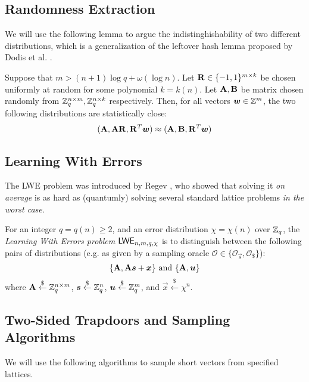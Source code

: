 \subsection{Randomness Extraction}

We will use the following lemma to argue the indistinghishability of two different distributions, which is a generalization of the leftover hash lemma proposed by Dodis et al. \cite{EC:DodReySmi04}.

\begin{lemma} \label{lem:lhl}
Suppose that $m > (n + 1) \log q + \omega(\log n)$. Let $\mathbf{R} \in \{-1, 1\}^{m \times k}$ be chosen uniformly at random for some polynomial $k = k(n)$. Let $\mathbf{A}, \mathbf{B}$ be matrix chosen randomly from $\mathbb{Z}^{n \times m}_q, \mathbb{Z}^{n \times k}_q$ respectively. Then, for all vectors $\boldsymbol{w} \in \mathbb{Z}^m$, the two following distributions are statistically close:
$$(\mathbf{A}, \mathbf{A} \mathbf{R}, \mathbf{R}^T \boldsymbol{w}) \approx (\mathbf{A}, \mathbf{B}, \mathbf{R}^T \boldsymbol{w})$$
\end{lemma}

\subsection{Learning With Errors}

The LWE problem was introduced by Regev \cite{STOC:Regev05}, who showed that solving it \emph{on average} is
as hard as (quantumly) solving several standard lattice problems \emph{in the worst case}.
\begin{definition}[LWE]\label{defn:lwe}
For an integer $q = q(n) \geq 2$, and an error distribution $\chi = \chi(n)$ over $\mathbb{Z}_q$, the \emph{Learning With Errors problem $\mathsf{LWE}_{n, m, q, \chi}$} is to distinguish between the following pairs of distributions (e.g. as given by a sampling oracle $\mathcal{O}\in\{\mathcal{O}_{\vec{s}}, \mathcal{O}_{\$}\}$):
$$\{\mathbf{A}, \mathbf{A}\boldsymbol{s} + \boldsymbol{x}\} \  \text{and} \ \{\mathbf{A}, \boldsymbol{u}\}$$
where $\mathbf{A} \overset{\$}{\leftarrow}\mathbb{Z}^{n \times m}_q$, $\boldsymbol{s} \overset{\$}{\leftarrow} \mathbb{Z}^n_q$, $\boldsymbol{u} \overset{\$}{\leftarrow} \mathbb{Z}^m_q$, and $\vec{x} \overset{\$}{\leftarrow} \chi^n$.   
\end{definition} 


\subsection{Two-Sided Trapdoors and Sampling Algorithms}

We will use the following algorithms to sample short vectors from specified lattices.

